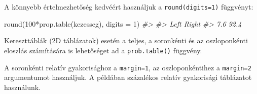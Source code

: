 \documentclass[
]{book}
\newenvironment{Shaded}{\begin{snugshade}}{\end{snugshade}}
\newcommand{\AttributeTok}[1]{\textcolor[rgb]{0.77,0.63,0.00}{#1}}
\newcommand{\CommentTok}[1]{\textcolor[rgb]{0.56,0.35,0.01}{\textit{#1}}}
\newcommand{\DecValTok}[1]{\textcolor[rgb]{0.00,0.00,0.81}{#1}}
\newcommand{\FunctionTok}[1]{\textcolor[rgb]{0.00,0.00,0.00}{#1}}
\newcommand{\NormalTok}[1]{#1}
\newcommand{\OtherTok}[1]{\textcolor[rgb]{0.56,0.35,0.01}{#1}}
\newcommand{\SpecialCharTok}[1]{\textcolor[rgb]{0.00,0.00,0.00}{#1}}
\newcommand{\StringTok}[1]{\textcolor[rgb]{0.31,0.60,0.02}{#1}}
\begin{document}
A könnyebb értelmezhetőség kedvéért használjuk a \texttt{round(digits=1)} függvényt:

\begin{Shaded}
\begin{Highlighting}[]
\FunctionTok{round}\NormalTok{(}\DecValTok{100}\SpecialCharTok{*}\FunctionTok{prop.table}\NormalTok{(kezesseg), }\AttributeTok{digits =} \DecValTok{1}\NormalTok{)}
\CommentTok{\#\textgreater{} }
\CommentTok{\#\textgreater{}  Left Right }
\CommentTok{\#\textgreater{}   7.6  92.4}
\end{Highlighting}
\end{Shaded}

Kereszttáblák (2D táblázatok) esetén a teljes, a soronkénti és az oszloponkénti eloszlás számítására is lehetőséget ad a \texttt{prob.table()} függvény.

A soronkénti relatív gyakorisághoz a \texttt{margin=1}, az oszloponkéntihez a \texttt{margin=2} argumentumot használjuk. A példában százalékos relatív gyakorisági táblázatot használunk.

\begin{Shaded}
\end{Shaded}
\end{document}
